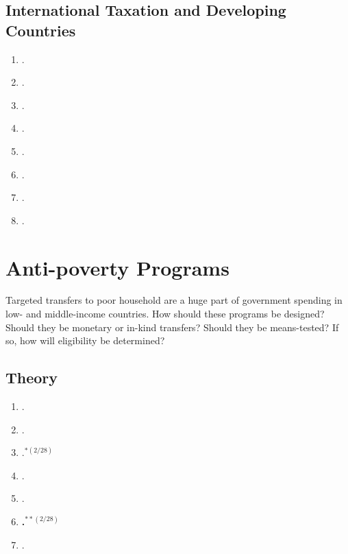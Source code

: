 \documentclass[11pt]{article}
\begin{document}
\subsection{International Taxation and Developing Countries}

\begin{enumerate}
\item {}.
\item {}.
\item {}.
\item {}.
\item {}.
\item {}.
\item {}.
\item {}.
\end{enumerate}

\section{ Anti-poverty Programs}
Targeted transfers to poor household are a huge part of government spending in low- and middle-income countries. How should these programs be designed? Should they be monetary or in-kind transfers? Should they be means-tested? If so, how will eligibility be determined?


\subsection{Theory}

\begin{enumerate}
\item {}.
\item {}.
\item {}.$^{*(2/28)}$
\item {}.
\item {}.
\item \textbf{.$^{**(2/28)}$}
\item {}.
\end{enumerate}
\end{document}
